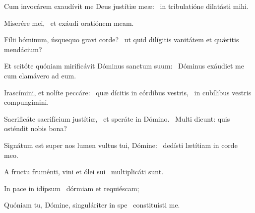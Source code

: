 \item Cum invocárem exaudívit me Deus justítiæ meæ:~\psstar{} in tribulatióne dilatásti mihi.

\item Miserére mei,~\psstar{} et exáudi oratiónem meam.

\item Fílii hóminum, úsquequo gravi corde?~\psstar{} ut quid dilígitis vanitátem et quǽritis mendácium?

\item Et scitóte quóniam mirificávit Dóminus sanctum suum:~\psstar{} Dóminus exáudiet me cum clamávero ad eum.

\item Irascímini, et nolíte peccáre:~\pscross{} quæ dícitis in córdibus vestris,~\psstar{} in cubílibus vestris compungímini.

\item Sacrificáte sacrifícium justítiæ,~\pscross{} et speráte in Dómino.~\psstar{} Multi dicunt: quis osténdit nobis bona?

\item Signátum est super nos lumen vultus tui, Dómine:~\psstar{} dedísti lætítiam in corde meo.

\item A fructu fruménti, vini et ólei sui~\psstar{} multiplicáti sunt.

\item In pace in idípsum~\psstar{} dórmiam et requiéscam;

\item Quóniam tu, Dómine, singuláriter in spe~\psstar{} constituísti me.


